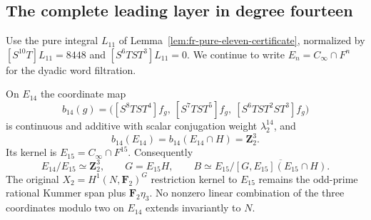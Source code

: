 \subsection{The complete leading layer in degree fourteen}
\label{subsec:fr-fourteen-normalization}

Use the pure integral $L_{11}$ of
Lemma~\ref{lem:fr-pure-eleven-certificate}, normalized by
$[S^{10}T]L_{11}=8448$ and $[S^6TST^3]L_{11}=0$.
We continue to write $E_n=C_\infty\cap F^n$ for the dyadic
word filtration.

\begin{theorem}\label{thm:fr-fourteen-normalization}
On $E_{14}$ the coordinate map
\[
 b_{14}(g)=\bigl(
 [S^8TST^4]f_g,\ 
 [S^7TST^5]f_g,\ 
 [S^6TST^2ST^3]f_g
 \bigr)
\]
is continuous and additive with scalar conjugation weight
$\lambda_2^{14}$, and
\[
 b_{14}(E_{14})=b_{14}(E_{14}\cap H)=\mathbf Z_2^3.
\]
Its kernel is $E_{15}=C_\infty\cap F^{15}$. Consequently
\[
 E_{14}/E_{15}\simeq\mathbf Z_2^3,\qquad
 G=E_{15}H,\qquad
 B\simeq E_{15}/\overline{[G,E_{15}](E_{15}\cap H)}.
\]
The original $X_2=H^1(N,\mathbf F_2)^G$ restriction kernel
to $E_{15}$ remains the odd-prime rational Kummer span plus
$\mathbf F_2\eta_3$. No nonzero linear combination of the three
coordinates modulo two on $E_{14}$ extends invariantly to $N$.
\end{theorem}

